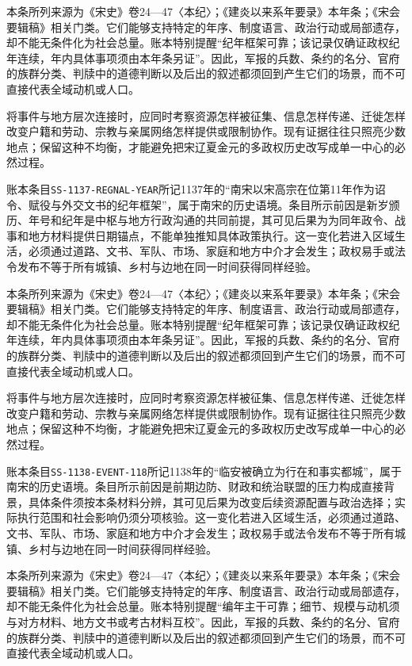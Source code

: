 本条所列来源为《宋史》卷24—47〈本纪〉；《建炎以来系年要录》本年条；《宋会要辑稿》相关门类。它们能够支持特定的年序、制度语言、政治行动或局部遗存，却不能无条件化为社会总量。账本特别提醒“纪年框架可靠；该记录仅确证政权纪年连续，年内具体事项须由本年条另证”。因此，军报的兵数、条约的名分、官府的族群分类、判牍中的道德判断以及后出的叙述都须回到产生它们的场景，而不可直接代表全域动机或人口。

将事件与地方层次连接时，应同时考察资源怎样被征集、信息怎样传递、迁徙怎样改变户籍和劳动、宗教与亲属网络怎样提供或限制协作。现有证据往往只照亮少数地点；保留这种不均衡，才能避免把宋辽夏金元的多政权历史改写成单一中心的必然过程。

账本条目\texttt{SS-1137-REGNAL-YEAR}所记1137年的“南宋以宋高宗在位第11年作为诏令、赋役与外交文书的纪年框架”，属于南宋的历史语境。条目所示前因是新岁颁历、年号和纪年是中枢与地方行政沟通的共同前提，其可见后果为为同年政令、战事和地方材料提供日期锚点，不能单独推知具体政策执行。这一变化若进入区域生活，必须通过道路、文书、军队、市场、家庭和地方中介才会发生；政权易手或法令发布不等于所有城镇、乡村与边地在同一时间获得同样经验。

本条所列来源为《宋史》卷24—47〈本纪〉；《建炎以来系年要录》本年条；《宋会要辑稿》相关门类。它们能够支持特定的年序、制度语言、政治行动或局部遗存，却不能无条件化为社会总量。账本特别提醒“纪年框架可靠；该记录仅确证政权纪年连续，年内具体事项须由本年条另证”。因此，军报的兵数、条约的名分、官府的族群分类、判牍中的道德判断以及后出的叙述都须回到产生它们的场景，而不可直接代表全域动机或人口。

将事件与地方层次连接时，应同时考察资源怎样被征集、信息怎样传递、迁徙怎样改变户籍和劳动、宗教与亲属网络怎样提供或限制协作。现有证据往往只照亮少数地点；保留这种不均衡，才能避免把宋辽夏金元的多政权历史改写成单一中心的必然过程。

账本条目\texttt{SS-1138-EVENT-118}所记1138年的“临安被确立为行在和事实都城”，属于南宋的历史语境。条目所示前因是前期边防、财政和统治联盟的压力构成直接背景，具体条件须按本条材料分辨，其可见后果为改变后续资源配置与政治选择；实际执行范围和社会影响仍须分项核验。这一变化若进入区域生活，必须通过道路、文书、军队、市场、家庭和地方中介才会发生；政权易手或法令发布不等于所有城镇、乡村与边地在同一时间获得同样经验。

本条所列来源为《宋史》卷24—47〈本纪〉；《建炎以来系年要录》本年条；《宋会要辑稿》相关门类。它们能够支持特定的年序、制度语言、政治行动或局部遗存，却不能无条件化为社会总量。账本特别提醒“编年主干可靠；细节、规模与动机须与对方材料、地方文书或考古材料互校”。因此，军报的兵数、条约的名分、官府的族群分类、判牍中的道德判断以及后出的叙述都须回到产生它们的场景，而不可直接代表全域动机或人口。

